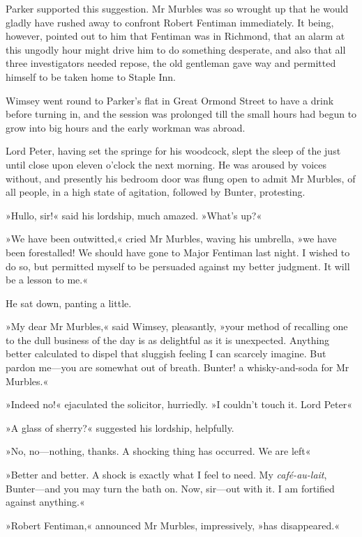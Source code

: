 Parker supported this suggestion. Mr Murbles was so wrought up that he would gladly have rushed away to confront Robert Fentiman immediately. It being, however, pointed out to him that Fentiman was in Richmond, that an alarm at this ungodly hour might drive him to do something desperate, and also that all three investigators needed repose, the old gentleman gave way and permitted himself to be taken home to Staple Inn.

Wimsey went round to Parker's flat in Great Ormond Street to have a drink before turning in, and the session was prolonged till the small hours had begun to grow into big hours and the early workman was abroad.

Lord Peter, having set the springe for his woodcock, slept the sleep of the just until close upon eleven o'clock the next morning. He was aroused by voices without, and presently his bedroom door was flung open to admit Mr Murbles, of all people, in a high state of agitation, followed by Bunter, protesting.

»Hullo, sir!« said his lordship, much amazed. »What's up?«

»We have been outwitted,« cried Mr Murbles, waving his umbrella, »we have been forestalled! We should have gone to Major Fentiman last night. I wished to do so, but permitted myself to be persuaded against my better judgment. It will be a lesson to me.«

He sat down, panting a little.

»My dear Mr Murbles,« said Wimsey, pleasantly, »your method of recalling one to the dull business of the day is as delightful as it is unexpected. Anything better calculated to dispel that sluggish feeling I can scarcely imagine. But pardon me\allowbreak---\allowbreak you are somewhat out of breath. Bunter! a whisky-and-soda for Mr Murbles.«

»Indeed no!« ejaculated the solicitor, hurriedly. »I couldn't touch it. Lord Peter\longdash«

»A glass of sherry?« suggested his lordship, helpfully.

»No, no\allowbreak---\allowbreak nothing, thanks. A shocking thing has occurred. We are left\longdash«

»Better and better. A shock is exactly what I feel to need. My \textit{café-au-lait}, Bunter\allowbreak---\allowbreak and you may turn the bath on. Now, sir\allowbreak---\allowbreak out with it. I am fortified against anything.«

»Robert Fentiman,« announced Mr Murbles, impressively, »has disappeared.«

